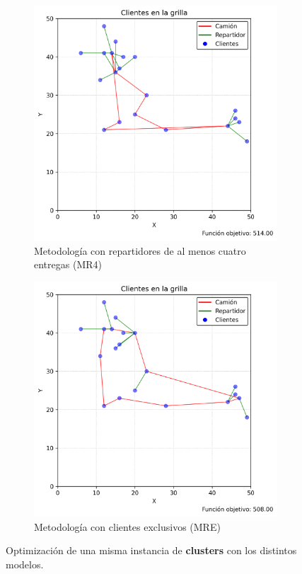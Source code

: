 \documentclass[10pt]{article}
\begin{document}
\begin{figure}[htbp]
	\vspace{0.5cm}
	
	\begin{subfigure}[b]{0.45\textwidth}
		\centering
		\includegraphics[width=\textwidth]{figuras/plano_clusters_cuatro_o_mas_0.png}
		\caption{Metodología con repartidores de al menos cuatro entregas (MR4)}
		\label{fig:sub3}
	\end{subfigure}
	\hfill
	\begin{subfigure}[b]{0.45\textwidth}
		\centering
		\includegraphics[width=\textwidth]{figuras/plano_clusters_exclusivos_0.png}
		\caption{Metodología con clientes exclusivos (MRE)}
		\label{fig:sub4}
	\end{subfigure}
	
	\caption{Optimización de una misma instancia de \textbf{clusters} con los distintos modelos.}
	\label{fig:compuesta2}
\end{figure}
\end{document}
